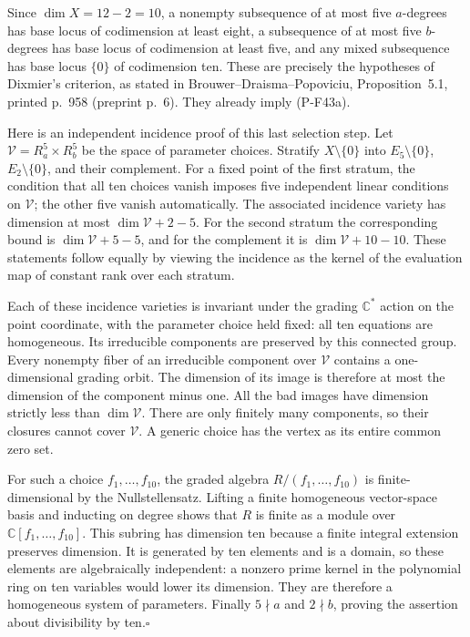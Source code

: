 \documentclass[11pt,a4paper]{article}
\begin{document}
Since $\dim X=12-2=10$, a nonempty subsequence of at most
five $a$-degrees has base locus of codimension at least
eight, a subsequence of at most five $b$-degrees has base
locus of codimension at least five, and any mixed
subsequence has base locus $\{0\}$ of codimension ten.
These are precisely the hypotheses of Dixmier's criterion,
as stated in Brouwer--Draisma--Popoviciu, Proposition~5.1,
printed p.~958 (preprint p.~6). They already imply (P-F43a).

Here is an independent incidence proof of this last
selection step. Let $\mathcal V=R_a^5\times R_b^5$ be the
space of parameter choices. Stratify $X\setminus\{0\}$
into $E_5\setminus\{0\}$, $E_2\setminus\{0\}$, and their
complement. For a fixed point of the first stratum, the
condition that all ten choices vanish imposes five
independent linear conditions on $\mathcal V$; the other
five vanish automatically. The associated incidence
variety has dimension at most $\dim\mathcal V+2-5$.
For the second stratum the corresponding bound is
$\dim\mathcal V+5-5$, and for the complement it is
$\dim\mathcal V+10-10$. These statements follow equally
by viewing the incidence as the kernel of the evaluation
map of constant rank over each stratum.

Each of these incidence varieties is invariant under
the grading $\mathbb C^*$ action on the point coordinate,
with the parameter choice held fixed: all ten equations
are homogeneous. Its irreducible components are preserved
by this connected group. Every nonempty fiber of an
irreducible component over $\mathcal V$ contains a
one-dimensional grading orbit. The dimension of its image
is therefore at most the dimension of the component minus
one. All the bad images have dimension strictly less than
$\dim\mathcal V$. There are only finitely many components,
so their closures cannot cover $\mathcal V$. A generic
choice has the vertex as its entire common zero set.

For such a choice $f_1,\ldots,f_{10}$, the graded algebra
$R/(f_1,\ldots,f_{10})$ is finite-dimensional by the
Nullstellensatz. Lifting a finite homogeneous vector-space
basis and inducting on degree shows that $R$ is finite as
a module over $\mathbb C[f_1,\ldots,f_{10}]$. This subring
has dimension ten because a finite integral extension
preserves dimension. It is generated by ten elements and
is a domain, so these elements are algebraically
independent: a nonzero prime kernel in the polynomial
ring on ten variables would lower its dimension. They
are therefore a homogeneous system of parameters.
Finally $5\nmid a$ and $2\nmid b$, proving the assertion
about divisibility by ten.\hfill$\square$
\end{document}
